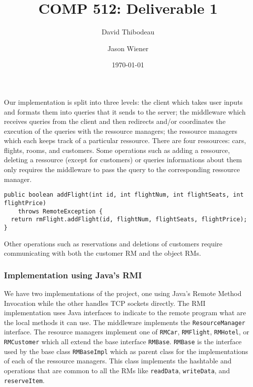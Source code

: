\documentclass[12pt]{article}
\author{David Thibodeau \and Jason Wiener}
\title{COMP 512: Deliverable 1}
\date{\today}
\theoremstyle{plain}%
\theoremstyle{definition}
\theoremstyle{remark}
\newcommand{\java}[1]{{\lstinline!#1!}}
\begin{document}
\maketitle

Our implementation is split into three levels: the client which takes
user inputs and formats them into queries that it sends to the server;
the middleware which receives queries from the client and then redirects and/or
coordinates the execution of the queries with the ressource managers;
the ressource managers which each keeps track of a particular
ressource. There are four ressources: cars, flights, rooms, and
customers. Some operations such as adding a ressource, deleting a
ressource (except for customers) or queries informations about them
only requires the middleware to pass the query to the corresponding
ressource manager. 
\begin{lstlisting}
public boolean addFlight(int id, int flightNum, int flightSeats, int flightPrice) 
    throws RemoteException {
  return rmFlight.addFlight(id, flightNum, flightSeats, flightPrice);
}
\end{lstlisting}
Other operations such as reservations and deletions
of customers require communicating with both the
customer RM and the object RMs.

\subsubsection*{Implementation using Java's RMI}
We have two implementations of the project, one using Java's Remote
Method Invocation while the other handles TCP sockets directly. The
RMI implementation uses Java interfaces to indicate to the remote
program what are the local methods it can use. The middleware
implements the \java{ResourceManager} interface. The resource managers
implement one of \java{RMCar}, \java{RMFlight}, \java{RMHotel}, or
\java{RMCustomer} which all extend the base interface \java{RMBase}.
\java{RMBase} is the interface used by the base class
\java{RMBaseImpl} which as parent class for the implementations of
each of the ressource managers. This class implements the hashtable
and operations that are common to all the RMs like \java{readData},
\java{writeData}, and \java{reserveItem}.
\end{document}
